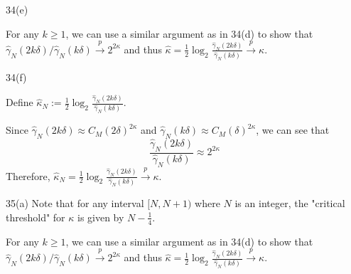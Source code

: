 \documentclass{article}
\begin{document}
34(e)

For any $k \geq 1$, we can use a similar argument as in 34(d) to show that $\hat \gamma_N(2k\delta)/\hat \gamma_N(k\delta) \xrightarrow{p} 2^{2\kappa}$ and thus $\hat \kappa = \frac{1}{2} \log_2 \frac{\hat \gamma_N(2k\delta)}{\hat \gamma_N(k\delta)} \xrightarrow{p} \kappa$.

34(f)

Define $\hat \kappa_N := \frac{1}{2} \log_2 \frac{\hat \gamma_N(2k\delta)}{\hat \gamma_N(k\delta)}$. 

Since $\hat \gamma_N(2k\delta) \approx C_M (2\delta)^{2\kappa}$ and $\hat \gamma_N(k\delta) \approx C_M (\delta)^{2\kappa}$, we can see that
$$ \frac{\hat \gamma_N(2k\delta)}{\hat \gamma_N(k\delta)} \approx 2^{2\kappa}$$
Therefore, $\hat \kappa_N = \frac{1}{2} \log_2 \frac{\hat \gamma_N(2k\delta)}{\hat \gamma_N(k\delta)} \xrightarrow{p} \kappa$.

35(a)
Note that for any interval $[N, N+1)$ where $N$ is an integer, the "critical threshold" for $\kappa$ is given by $N - \frac{1}{4}$. 

For any $k \geq 1$, we can use a similar argument as in 34(d) to show that $\hat \gamma_N(2k\delta)/\hat \gamma_N(k\delta) \xrightarrow{p} 2^{2\kappa}$ and thus $\hat \kappa = \frac{1}{2} \log_2 \frac{\hat \gamma_N(2k\delta)}{\hat \gamma_N(k\delta)} \xrightarrow{p} \kappa$.
\end{document}
